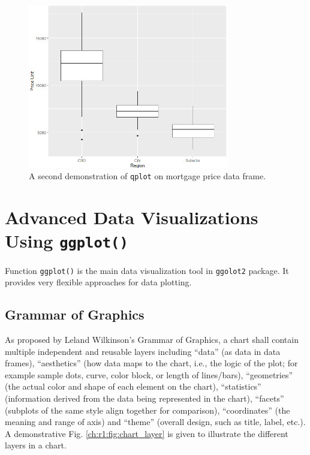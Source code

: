 \begin{figure}
	\centering
	\includegraphics[width=250pt]{chapters/ch-r/figures/mortgage_demo2.png}
	\caption{A second demonstration of \texttt{qplot} on mortgage price data frame.} \label{ch:r1:fig:mortgage_demo2}
\end{figure}

\section{Advanced Data Visualizations Using \texttt{ggplot()}} \label{ch:r1:sec:ggplot}

Function \verb|ggplot()| is the main data visualization tool in \verb|ggolot2| package. It provides very flexible approaches for data plotting.

\subsection{Grammar of Graphics}

As proposed by Leland Wilkinson's Grammar of Graphics, a chart shall contain multiple independent and reusable layers including ``data'' (as data in data frames), ``aesthetics'' (how data maps to the chart, i.e., the logic of the plot; for example sample dots, curve, color block, or length of lines/bars), ``geometries'' (the actual color and shape of each element on the chart), ``statistics'' (information derived from the data being represented in the chart), ``facets'' (subplots of the same style align together for comparison), ``coordinates'' (the meaning and range of axis) and ``theme'' (overall design, such as title, label, etc.). A demonstrative Fig. \ref{ch:r1:fig:chart_layer} is given to illustrate the different layers in a chart.

